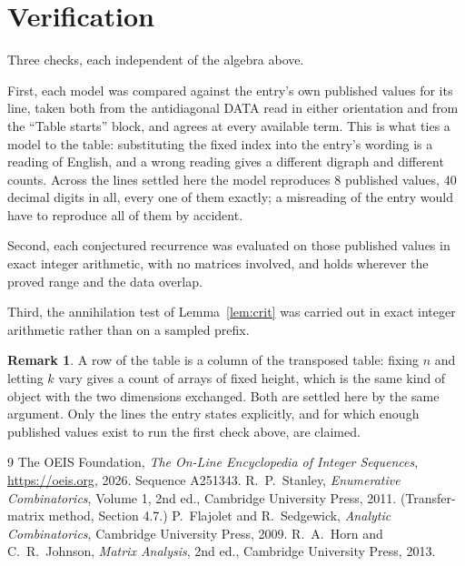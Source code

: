 \documentclass[11pt,a4paper]{article}
\theoremstyle{plain}
\theoremstyle{definition}
\newtheorem{remark}[theorem]{Remark}
\begin{document}
\section{Verification}

Three checks, each independent of the algebra above.

First, each model was compared against the entry's own published values for its line, taken
both from the antidiagonal DATA read in either orientation and from the ``Table starts''
block, and agrees at every available term. This is what ties a model to the table:
substituting the fixed index into the entry's wording is a reading of English, and a wrong
reading gives a different digraph and different counts. Across the lines settled here the
model reproduces $8$ published values, $40$ decimal digits in all, every one of
them exactly; a misreading of the entry would have to reproduce all of them by accident.

Second, each conjectured recurrence was evaluated on those published values in exact
integer arithmetic, with no matrices involved, and holds wherever the proved range and the
data overlap.

Third, the annihilation test of Lemma~\ref{lem:crit} was carried out in exact integer
arithmetic rather than on a sampled prefix.

\begin{remark}
A row of the table is a column of the transposed table: fixing $n$ and letting $k$ vary gives a
count of arrays of fixed height, which is the same kind of object with the two dimensions
exchanged. Both are settled here by the same argument. Only the lines the entry states
explicitly, and for which enough published values exist to run the first check above, are
claimed.
\end{remark}

\begin{thebibliography}{9}
 The OEIS Foundation, \emph{The On-Line Encyclopedia of Integer
Sequences}, \url{https://oeis.org}, 2026. Sequence A251343.
 R.~P.~Stanley, \emph{Enumerative Combinatorics}, Volume 1, 2nd ed.,
Cambridge University Press, 2011. (Transfer-matrix method, Section 4.7.)
 P.~Flajolet and R.~Sedgewick, \emph{Analytic Combinatorics}, Cambridge
University Press, 2009.
 R.~A.~Horn and C.~R.~Johnson, \emph{Matrix Analysis}, 2nd ed., Cambridge
University Press, 2013.
\end{thebibliography}
\end{document}
